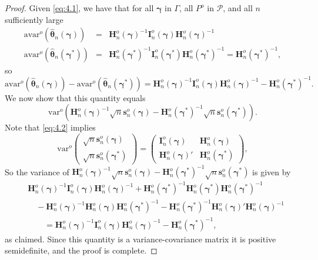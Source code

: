 \begin{proof}
Given \eqref{eq:4.1}, we have that for all $\boldsymbol{\gamma}$ in $\Gamma$, all $P^o$ in $\mathcal{P}$, and all $n$
sufficiently large
\begin{eqnarray*}
\mathrm{avar}^o\left(\hat{\boldsymbol{\theta}}_n(\boldsymbol{\gamma})\right) &=& \mathbf{H}_n^o(\boldsymbol{\gamma})^{-1}\mathbf{I}_n^o(\boldsymbol{\gamma})\mathbf{H}_n^o(\boldsymbol{\gamma})^{-1}\\
\mathrm{avar}^o\left(\hat{\boldsymbol{\theta}}_n(\boldsymbol{\gamma}^*)\right) &=& \mathbf{H}_n^o(\boldsymbol{\gamma}^*)^{-1}\mathbf{I}_n^o(\boldsymbol{\gamma}^*)\mathbf{H}_n^o(\boldsymbol{\gamma}^*)^{-1} = \mathbf{H}_n^o(\boldsymbol{\gamma}^*)^{-1},
\end{eqnarray*}
so
\[
\mathrm{avar}^o\left(\hat{\boldsymbol{\theta}}_n(\boldsymbol{\gamma})\right) - \mathrm{avar}^o\left(\hat{\boldsymbol{\theta}}_n(\boldsymbol{\gamma}^*)\right) = \mathbf{H}_n^o(\boldsymbol{\gamma})^{-1}\mathbf{I}_n^o(\boldsymbol{\gamma})\mathbf{H}_n^o(\boldsymbol{\gamma})^{-1} - \mathbf{H}_n^o(\boldsymbol{\gamma}^*)^{-1}.
\]
We now show that this quantity equals
\[
\mathrm{var}^o(\mathbf{H}_n^o(\boldsymbol{\gamma})^{-1}\sqrt{n}\mathbf{s}_n^o(\boldsymbol{\gamma}) - \mathbf{H}_n^o(\boldsymbol{\gamma}^*)^{-1}\sqrt{n}\mathbf{s}_n^o(\boldsymbol{\gamma}^*)).
\]
Note that \eqref{eq:4.2} implies
\[
\mathrm{var}^o\left(\begin{array}{c}\sqrt{n}\mathbf{s}_n^o(\boldsymbol{\gamma})\\\sqrt{n}\mathbf{s}_n^o(\boldsymbol{\gamma}^*)\end{array}\right) = \begin{pmatrix} \mathbf{I}_n^o(\boldsymbol{\gamma}) & \mathbf{H}_n^o(\boldsymbol{\gamma}) \\ \mathbf{H}_n^o(\boldsymbol{\gamma})' & \mathbf{H}_n^o(\boldsymbol{\gamma}^*) \end{pmatrix},
\]
So the variance of $\mathbf{H}_n^o(\boldsymbol{\gamma})^{-1}\sqrt{n}\mathbf{s}_n^o(\boldsymbol{\gamma}) - \mathbf{H}_n^o(\boldsymbol{\gamma}^*)^{-1}\sqrt{n}\mathbf{s}_n^o(\boldsymbol{\gamma}^*)$ is given by
\begin{align*}
&\mathbf{H}_n^o(\boldsymbol{\gamma})^{-1}\mathbf{I}_n^o(\boldsymbol{\gamma})\mathbf{H}_n^o(\boldsymbol{\gamma})^{-1} + \mathbf{H}_n^o(\boldsymbol{\gamma}^*)^{-1}\mathbf{H}_n^o(\boldsymbol{\gamma}^*)\mathbf{H}_n^o(\boldsymbol{\gamma}^*)^{-1} \\
&\quad - \mathbf{H}_n^o(\boldsymbol{\gamma})^{-1}\mathbf{H}_n^o(\boldsymbol{\gamma})\mathbf{H}_n^o(\boldsymbol{\gamma}^*)^{-1} - \mathbf{H}_n^o(\boldsymbol{\gamma}^*)^{-1}\mathbf{H}_n^o(\boldsymbol{\gamma})'\mathbf{H}_n^o(\boldsymbol{\gamma})^{-1} \\
&\qquad = \mathbf{H}_n^o(\boldsymbol{\gamma})^{-1}\mathbf{I}_n^o(\boldsymbol{\gamma})\mathbf{H}_n^o(\boldsymbol{\gamma})^{-1} - \mathbf{H}_n^o(\boldsymbol{\gamma}^*)^{-1},
\end{align*}
as claimed. Since this quantity is a variance-covariance matrix it is positive
semidefinite, and the proof is complete.
\end{proof}

